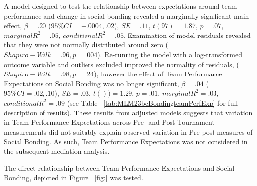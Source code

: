 \begin{CJK}{UTF8}{gbsn}
  A model designed to test the relationship between expectations around team performance and change in social bonding revealed a marginally significant main effect, $\beta = .20$ ($95\% CI =  -.0004, .02$), $SE = .11$, $t(97) = 1.87$, $p = .07$, $marginal R^2 = .05$, $conditional R^2 = .05$.  Examination of model residuals revealed that they were not normally distributed around zero ($Shapiro-Wilk = .96, p = .004$).  Re-running the model with a log-transformed outcome variable and outliers excluded improved the normality of residuals, ($Shapiro-Wilk = .98, p = .24$), however the effect of Team Performance Expectations on Social Bonding was no longer significant, $\beta = .04$ ($95\% CI =  .02, .10$), $SE = .03$, $t()) = 1.29$, $p = .01$, $marginal R^2 = .03$, $conditional R^2 = .09$ (see Table ~\ref{tab:MLM23bcBondingteamPerfExp} for full description of results).
  These results from adjusted models suggests that variation in Team Performance Expectations across Pre- and Post-Tournament measurements did not suitably explain observed variation in Pre-post measures of Social Bonding.  As such, Team Performance Expectations was not considered in the subsequent mediation analysis.

  
  \restoregeometry







  The direct relationship between Team Performance Expectations and Social Bonding, depicted in Figure ~\ref{fig:} was tested.


\end{CJK}
